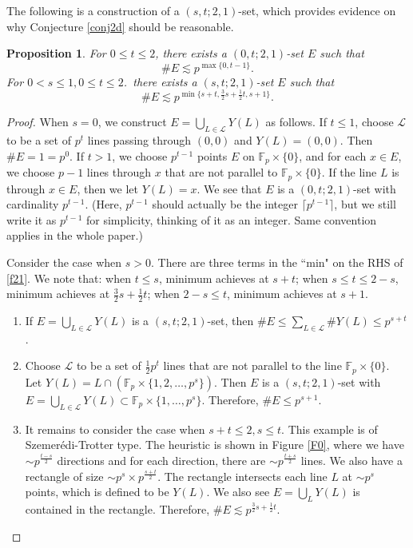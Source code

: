 \documentclass[10pt]{article}
\newtheorem{proposition}[theorem]{Proposition}
\newcommand{\cL}{\mathcal{L}}
\newcommand{\Fp}{\mathbb{F}_p}
\begin{document}
The following is a construction of a $(s,t;2,1)$-set, which provides evidence on why Conjecture \ref{conj2d} should be reasonable.

\begin{proposition}\label{prop2d}
For $0\le t\le 2$, there exists a $(0,t;2,1)$-set $E$ such that
    \begin{equation}
        \#E\lesssim p^{\max\{0,t-1\}}.
    \end{equation}
For $0<s\le 1, 0\le t\le 2$.\, there exists a $(s,t;2,1)$-set $E$ such that    
    \begin{equation}\label{f21}
        \#E\lesssim p^{\min\{s+t,\frac32s+\frac12t,s+1\}}.
    \end{equation}
\end{proposition}

\begin{proof}
When $s=0$, we construct $E=\bigcup_{L\in \cL} Y(L)$ as follows. If $t\le 1$, choose $\cL$ to be a set of $p^t$ lines passing through $(0,0)$ and $Y(L)=(0,0)$. Then $\#E=1=p^0$. If $t>1$, we choose $p^{t-1}$ points $E$ on $\Fp\times \{0\}$, and for each $x\in E$, we choose $p-1$ lines through $x$ that are not parallel to $\Fp\times \{0\}$. If the line $L$ is through $x\in E$, then we let $Y(L)=x$. We see that $E$ is a $(0,t;2,1)$-set with cardinality $p^{t-1}$. (Here, $p^{t-1}$ should actually be the integer $\lceil p^{t-1}\rceil$, but we still write it as $p^{t-1}$ for simplicity, thinking of it as an integer. Same convention applies in the whole paper.) 

Consider the case when $s>0$. There are three terms in the ``min" on the RHS of \eqref{f21}. We note that: when $t\le s$, minimum achieves at $s+t$; when $s\le t\le 2-s$, minimum achieves at $\frac32s+\frac12t$; when $2-s\le t$, minimum achieves at $s+1$.
\begin{enumerate}
    \item If $E=\bigcup_{L\in\cL} Y(L)$ is a $(s,t;2,1)$-set, then $\#E\le \sum_{L\in\cL} \#Y(L)\le p^{s+t}$.

    \item Choose $\cL$ to be a set of $\frac12 p^t$ lines that are not parallel to the line $\Fp\times\{0\}$. Let $Y(L)=L\cap (\Fp\times \{1,2,\dots,p^s\})$. Then $E$ is a $(s,t;2,1)$-set with $E=\bigcup_{L\in\cL} Y(L)\subset \Fp\times \{1,\dots,p^s\}$. Therefore, $\#E\le p^{s+1}$.

    \item It remains to consider the case when $s+t\le 2, s\le t$. This example is of Szemer\'edi-Trotter type. The heuristic is shown in Figure \ref{F0}, where we have $\sim p^{\frac{t-s}{2}}$ directions and for each direction, there are $\sim p^{\frac{t+s}{2}}$ lines. We also have a rectangle of size $\sim p^{s}\times p^{\frac{s+t}{2}}$. The rectangle intersects each line $L$ at $\sim p^s$ points, which is defined to be $Y(L)$. We also see $E=\bigcup_L Y(L)$ is contained in the rectangle. Therefore, $\#E\lesssim p^{\frac32s+\frac12t}$.


\end{enumerate}
\end{proof}
\end{document}
